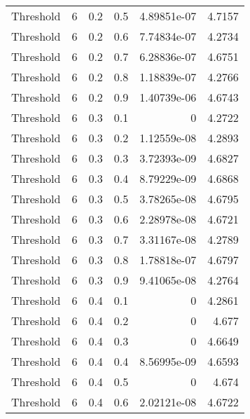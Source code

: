 \documentclass{article}
\begin{document}
\begin{longtable}[H]{lrrrrr}
 Threshold      &       6 &   0.2 &            0.5 &      4.89851e-07 &          4.7157 \\
 Threshold      &       6 &   0.2 &            0.6 &      7.74834e-07 &          4.2734 \\
 Threshold      &       6 &   0.2 &            0.7 &      6.28836e-07 &          4.6751 \\
 Threshold      &       6 &   0.2 &            0.8 &      1.18839e-07 &          4.2766 \\
 Threshold      &       6 &   0.2 &            0.9 &      1.40739e-06 &          4.6743 \\
 Threshold      &       6 &   0.3 &            0.1 &      0           &          4.2722 \\
 Threshold      &       6 &   0.3 &            0.2 &      1.12559e-08 &          4.2893 \\
 Threshold      &       6 &   0.3 &            0.3 &      3.72393e-09 &          4.6827 \\
 Threshold      &       6 &   0.3 &            0.4 &      8.79229e-09 &          4.6868 \\
 Threshold      &       6 &   0.3 &            0.5 &      3.78265e-08 &          4.6795 \\
 Threshold      &       6 &   0.3 &            0.6 &      2.28978e-08 &          4.6721 \\
 Threshold      &       6 &   0.3 &            0.7 &      3.31167e-08 &          4.2789 \\
 Threshold      &       6 &   0.3 &            0.8 &      1.78818e-07 &          4.6797 \\
 Threshold      &       6 &   0.3 &            0.9 &      9.41065e-08 &          4.2764 \\
 Threshold      &       6 &   0.4 &            0.1 &      0           &          4.2861 \\
 Threshold      &       6 &   0.4 &            0.2 &      0           &          4.677  \\
 Threshold      &       6 &   0.4 &            0.3 &      0           &          4.6649 \\
 Threshold      &       6 &   0.4 &            0.4 &      8.56995e-09 &          4.6593 \\
 Threshold      &       6 &   0.4 &            0.5 &      0           &          4.674  \\
 Threshold      &       6 &   0.4 &            0.6 &      2.02121e-08 &          4.6722 \\

\end{longtable}
\end{document}
